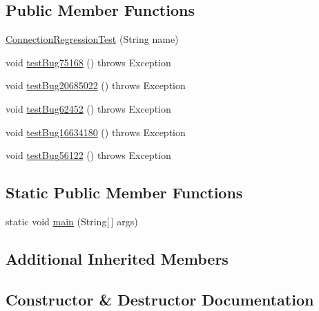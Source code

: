 \subsection*{Public Member Functions}
\begin{DoxyCompactItemize}
\item 
\mbox{\hyperlink{classtestsuite_1_1regression_1_1jdbc4_1_1_connection_regression_test_a937a8137ed6a3fe852103f0a5c538c72}{Connection\+Regression\+Test}} (String name)
\item 
void \mbox{\hyperlink{classtestsuite_1_1regression_1_1jdbc4_1_1_connection_regression_test_acc4c393fcbc483c6a959f10f561bb1b7}{test\+Bug75168}} ()  throws Exception 
\item 
void \mbox{\hyperlink{classtestsuite_1_1regression_1_1jdbc4_1_1_connection_regression_test_a22495738619bc4a10ae5064345a6cf67}{test\+Bug20685022}} ()  throws Exception 
\item 
void \mbox{\hyperlink{classtestsuite_1_1regression_1_1jdbc4_1_1_connection_regression_test_a15cc5d9ae0ab3041f166565d1dc1e577}{test\+Bug62452}} ()  throws Exception 
\item 
void \mbox{\hyperlink{classtestsuite_1_1regression_1_1jdbc4_1_1_connection_regression_test_aee5205f84d50438be8d927ae620baabc}{test\+Bug16634180}} ()  throws Exception 
\item 
void \mbox{\hyperlink{classtestsuite_1_1regression_1_1jdbc4_1_1_connection_regression_test_aec70fc87c4c6e697f6c831cd19ca8dcd}{test\+Bug56122}} ()  throws Exception 
\end{DoxyCompactItemize}
\subsection*{Static Public Member Functions}
\begin{DoxyCompactItemize}
\item 
static void \mbox{\hyperlink{classtestsuite_1_1regression_1_1jdbc4_1_1_connection_regression_test_a77149be5911ada887879c6f270b40891}{main}} (String\mbox{[}$\,$\mbox{]} args)
\end{DoxyCompactItemize}
\subsection*{Additional Inherited Members}


\subsection{Constructor \& Destructor Documentation}
\mbox{\label{classtestsuite_1_1regression_1_1jdbc4_1_1_connection_regression_test_a937a8137ed6a3fe852103f0a5c538c72}} 
